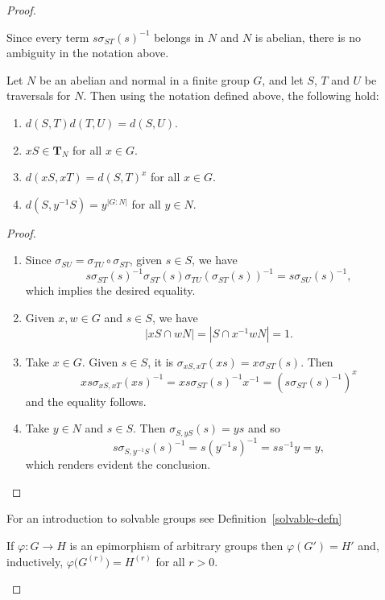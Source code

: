 \begin{solution}
\begin{proof}
\begin{rem}
    Since every term $s\sigma_{ST}(s)^{-1}$ belongs in $N$ and $N$ is abelian, there is no ambiguity in the notation above.
\end{rem}

\begin{lem}\label{d-identities}
    Let\/ $N$ be an abelian and normal in a finite group\/ $G$, and let\/ $S$, $T$ and\/ $U$ be traversals for\/ $N$. Then using the notation defined above, the following hold:
    \begin{enumerate}[\rm a)]
        \item $d(S, T)d(T, U) = d(S, U)$.
        \item $xS\in\mathbf T_N$ for all\/ $x\in G$.
        \item $d(xS, xT) = d(S, T)^x$ for all\/ $x \in G$.
        \item $d(S, y^{-1}S) = y^{|G:N|}$ for all\/ $y \in N$.
    \end{enumerate}
\end{lem}

\begin{proof}${}$
\begin{enumerate}[\rm a)]
    \item Since $\sigma_{SU}=\sigma_{TU}\circ\sigma_{ST}$, given $s\in S$, we have
    $$
        s\sigma_{ST}(s)^{-1}\sigma_{ST}(s)\sigma_{TU}(\sigma_{ST}(s))^{-1} = s\sigma_{SU}(s)^{-1},
    $$
    which implies the desired equality.

    \item Given $x,w\in G$ and $s\in S$, we have
    $$
        |xS\cap wN|=|S\cap x^{-1}wN|=1.
    $$

    \item Take $x\in G$. Given $s\in S$, it is $\sigma_{xS,xT}(xs)=x\sigma_{ST}(s)$. Then
    $$
        xs\sigma_{xS,xT}(xs)^{-1} = xs\sigma_{ST}(s)^{-1}x^{-1} = (s\sigma_{ST}(s)^{-1})^x
    $$
    and the equality follows.

    \item Take $y\in N$ and $s\in S$. Then $\sigma_{S,yS}(s)=ys$ and so
    $$
        s\sigma_{S,y^{-1}S}(s)^{-1}=s(y^{-1}s)^{-1}=ss^{-1}y=y,
    $$
    which renders evident the conclusion.
\end{enumerate}
\end{proof}

For an introduction to solvable groups see Definition~\ref{solvable-defn} 

\begin{rem}
    If\/ $\varphi\colon G\to H$ is an epimorphism of arbitrary groups then\/ $\varphi(G')=H'$ and, inductively, $\varphi\big(G^{(r)}\big) = H^{(r)}$ for all\/ $r>0$.
\end{rem}


\end{proof}
\end{solution}
